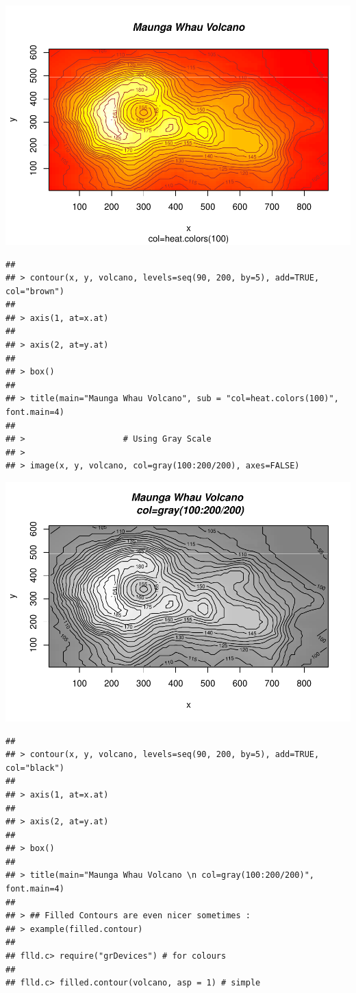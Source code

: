 \documentclass[
]{book}
\begin{document}
\includegraphics{TudodoR_files/figure-latex/unnamed-chunk-145-2.pdf}

\begin{verbatim}
## 
## > contour(x, y, volcano, levels=seq(90, 200, by=5), add=TRUE, col="brown")
## 
## > axis(1, at=x.at)
## 
## > axis(2, at=y.at)
## 
## > box()
## 
## > title(main="Maunga Whau Volcano", sub = "col=heat.colors(100)", font.main=4)
## 
## >                    # Using Gray Scale
## > 
## > image(x, y, volcano, col=gray(100:200/200), axes=FALSE)
\end{verbatim}

\includegraphics{TudodoR_files/figure-latex/unnamed-chunk-145-3.pdf}

\begin{verbatim}
## 
## > contour(x, y, volcano, levels=seq(90, 200, by=5), add=TRUE, col="black")
## 
## > axis(1, at=x.at)
## 
## > axis(2, at=y.at)
## 
## > box()
## 
## > title(main="Maunga Whau Volcano \n col=gray(100:200/200)", font.main=4)
## 
## > ## Filled Contours are even nicer sometimes :
## > example(filled.contour)
## 
## flld.c> require("grDevices") # for colours
## 
## flld.c> filled.contour(volcano, asp = 1) # simple
\end{verbatim}
\end{document}

